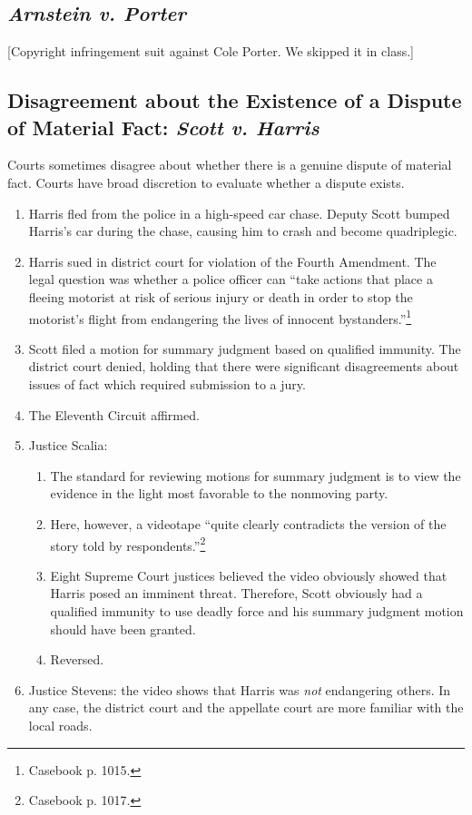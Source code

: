 \subsection{\emph{Arnstein v. Porter}}

[Copyright infringement suit against Cole Porter. We skipped it in class.]

\subsection{Disagreement about the Existence of a Dispute of Material Fact: 
\emph{Scott v. Harris}}

Courts sometimes disagree about whether there is a genuine dispute of material 
fact. Courts have broad discretion to evaluate whether a dispute exists.

\begin{enumerate}
    \item Harris fled from the police in a high-speed car chase. Deputy Scott 
    bumped Harris's car during the chase, causing him to crash and become 
    quadriplegic.
    \item Harris sued in district court for violation of the Fourth Amendment. 
    The legal question was whether a police officer can ``take actions that 
    place a fleeing motorist at risk of serious injury or death in order to 
    stop the motorist's flight from endangering the lives of innocent 
    bystanders.''\footnote{Casebook p. 1015.}
    \item Scott filed a motion for summary judgment based on qualified 
    immunity. The district court denied, holding that there were significant 
    disagreements about issues of fact which required submission to a jury.
    \item The Eleventh Circuit affirmed.
    \item Justice Scalia:
    \begin{enumerate}
        \item The standard for reviewing motions for summary judgment is to 
        view the evidence in the light most favorable to the nonmoving party.
        \item Here, however, a videotape ``quite clearly contradicts the 
        version of the story told by respondents.''\footnote{Casebook p. 1017.}
        \item Eight Supreme Court justices believed the video obviously showed 
        that Harris posed an imminent threat. Therefore, Scott obviously had a 
        qualified immunity to use deadly force and his summary judgment motion 
        should have been granted.
        \item Reversed.
    \end{enumerate}
    \item Justice Stevens: the video shows that Harris was \emph{not} 
    endangering others. In any case, the district court and the appellate 
    court are more familiar with the local roads.
\end{enumerate}
